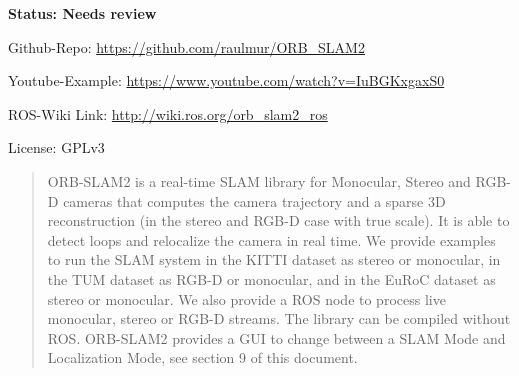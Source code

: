\documentclass[unrestricted]{meetingnotesminutes}
\begin{document}
\textbf{Status: Needs review}

Github-Repo: \url{https://github.com/raulmur/ORB\_SLAM2}

Youtube-Example: \url{https://www.youtube.com/watch?v=IuBGKxgaxS0}

ROS-Wiki Link: \url{http://wiki.ros.org/orb\_slam2\_ros}

License: GPLv3

\begin{quote}
ORB-SLAM2 is a real-time SLAM library for Monocular, Stereo and RGB-D cameras that computes the camera trajectory and a sparse 3D reconstruction (in the stereo and RGB-D case with true scale). It is able to detect loops and relocalize the camera in real time. We provide examples to run the SLAM system in the KITTI dataset as stereo or monocular, in the TUM dataset as RGB-D or monocular, and in the EuRoC dataset as stereo or monocular. We also provide a ROS node to process live monocular, stereo or RGB-D streams. The library can be compiled without ROS. ORB-SLAM2 provides a GUI to change between a SLAM Mode and Localization Mode, see section 9 of this document.
\end{quote}
\end{document}
